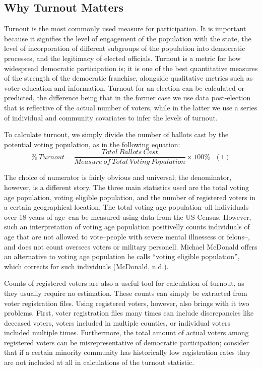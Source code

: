 \documentclass[12pt,twoside]{reedthesis}
\begin{document}
  \subsection{Why Turnout Matters}\label{why-turnout-matters}
  
  Turnout is the most commonly used measure for participation. It is
  important because it signifies the level of engagement of the population
  with the state, the level of incorporation of different subgroups of the
  population into democratic processes, and the legitimacy of elected
  officials. Turnout is a metric for how widespread democratic
  participation is; it is one of the best quantitative measures of the
  strength of the democratic franchise, alongside qualitative metrics such
  as voter education and information. Turnout for an election can be
  calculated or predicted, the difference being that in the former case we
  use data post-election that is reflective of the actual number of
  voters, while in the latter we use a series of individual and community
  covariates to infer the levels of turnout.
  
  To calculate turnout, we simply divide the number of ballots cast by the
  potential voting population, as in the following equation:\\
  \[ \% ~Turnout = \frac{Total~Ballots~Cast}{Measure~of~Total~Voting~Population}\times100\%~~~(1)\]
  
  The choice of numerator is fairly obvious and universal; the
  denominator, however, is a different story. The three main statistics
  used are the total voting age population, voting eligible population,
  and the number of registered voters in a certain geographical location.
  The total voting age population--all individuals over 18 years of
  age--can be measured using data from the US Census. However, such an
  interpretation of voting age population positivelly counts individuals
  of age that are not allowed to vote--people with severe mental
  illnessess or felons--, and does not count oversees voters or military
  personell. Michael McDonald offers an alternative to voting age
  population he calls ``voting eligible population'', which corrects for
  such individuals (McDonald, n.d.).
  
  Counts of registered voters are also a useful tool for calculation of
  turnout, as they usually require no estimation. These counts can simply
  be extracted from voter registration files. Using registered voters,
  however, also brings with it two problems. First, voter registration
  files many times can include discrepancies like deceased voters, voters
  included in multiple counties, or individual voters included multiple
  times. Furthermore, the total amount of actual voters among registered
  voters can be misrepresentative of democratic participation; consider
  that if a certain minority community has historically low registration
  rates they are not included at all in calculations of the turnout
  statistic.
  
\end{document}
